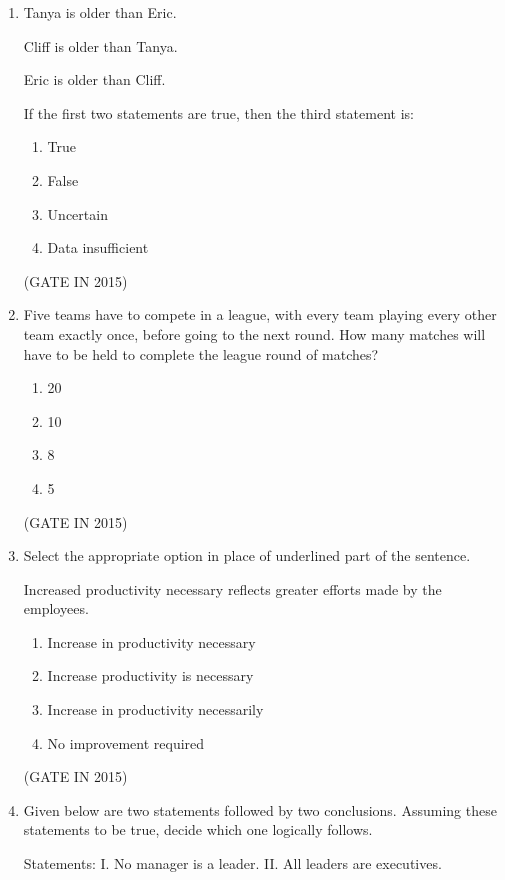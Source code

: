 \documentclass[journal]{IEEEtran}
\begin{document}
\begin{enumerate}
\item Tanya is older than Eric.

Cliff is older than Tanya.

Eric is older than Cliff.

If the first two statements are true, then the third statement is:


\begin{enumerate}
\item True
\item False
\item Uncertain
\item Data insufficient
\end{enumerate}
\hfill(GATE IN 2015)

\item Five teams have to compete in a league, with every team playing every other team exactly once, before going to the next round. How many matches will have to be held to complete the league round of matches?

\begin{multicols}{4}
\begin{enumerate}
\item 20
\item 10
\item 8
\item 5
\end{enumerate}
  \end{multicols} \hfill(GATE IN 2015)

\item Select the appropriate option in place of underlined part of the sentence.

Increased productivity necessary reflects greater efforts made by the employees.


\begin{enumerate}
\item Increase in productivity necessary
\item Increase productivity is necessary
\item Increase in productivity necessarily
\item No improvement required
\end{enumerate}
 \hfill(GATE IN 2015)

\item Given below are two statements followed by two conclusions. Assuming these statements to be true, decide which one logically follows.

Statements:
I. No manager is a leader.
II. All leaders are executives.


\end{enumerate}
\end{document}
